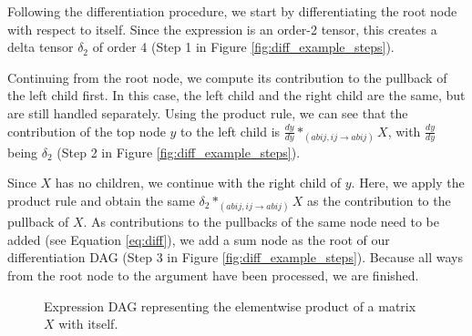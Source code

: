 \documentclass[12pt, a4paper]{report}
\begin{document}
Following the differentiation procedure, we start by differentiating the root node with respect to itself.
Since the expression is an order-2 tensor, this creates a delta tensor $\delta_2$ of order 4 (Step 1 in Figure \ref{fig:diff_example_steps}).

Continuing from the root node, we compute its contribution to the pullback of the left child first.
In this case, the left child and the right child are the same, but are still handled separately.
Using the product rule, we can see that the contribution of the top node $y$ to the left child is $\frac{dy}{dy} *_{(abij,ij \rightarrow abij)} X$, with $\frac{dy}{dy}$ being $\delta_2$ (Step 2 in Figure \ref{fig:diff_example_steps}).

Since $X$ has no children, we continue with the right child of $y$.
Here, we apply the product rule and obtain the same $\delta_2 *_{(abij,ij \rightarrow abij)} X$ as the contribution to the pullback of $X$.
As contributions to the pullbacks of the same node need to be added (see Equation \ref{eq:diff}), we add a sum node as the root of our differentiation DAG (Step 3 in Figure \ref{fig:diff_example_steps}).
Because all ways from the root node to the argument have been processed, we are finished.

\begin{figure}
    \centering
    \caption{Expression DAG representing the elementwise product of a matrix $X$ with itself.}
    \label{fig:diff_example_original}
\end{figure}
\end{document}
